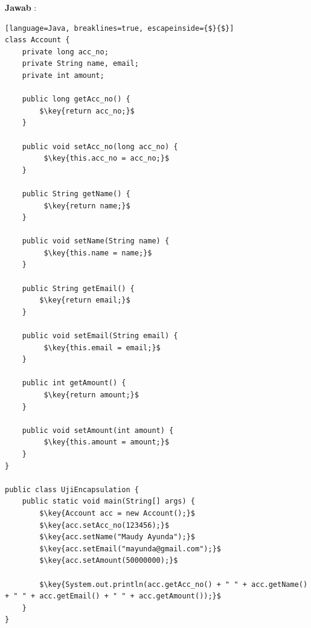 \documentclass[a4paper, 12pt]{article}
\newcommand{\ans}{\textbf{Jawab} :}
\newcommand{\key}[1]{\textcolor{red}{#1}}
\begin{document}
\begin{enumerate}
        \ans
        \begin{lstlisting}[language=Java, breaklines=true, escapeinside={$}{$}]
class Account {
    private long acc_no;
    private String name, email;
    private int amount;
        
    public long getAcc_no() {
        $\key{return acc_no;}$
    }
        
    public void setAcc_no(long acc_no) {
         $\key{this.acc_no = acc_no;}$
    }
        
    public String getName() {
         $\key{return name;}$
    }
        
    public void setName(String name) {
         $\key{this.name = name;}$
    }
        
    public String getEmail() {
        $\key{return email;}$
    }
        
    public void setEmail(String email) {
         $\key{this.email = email;}$
    }
        
    public int getAmount() {
         $\key{return amount;}$
    }
        
    public void setAmount(int amount) {
         $\key{this.amount = amount;}$
    }
}

public class UjiEncapsulation {
    public static void main(String[] args) {
        $\key{Account acc = new Account();}$
        $\key{acc.setAcc_no(123456);}$
        $\key{acc.setName("Maudy Ayunda");}$
        $\key{acc.setEmail("mayunda@gmail.com");}$
        $\key{acc.setAmount(50000000);}$
        
        $\key{System.out.println(acc.getAcc_no() + " " + acc.getName() + " " + acc.getEmail() + " " + acc.getAmount());}$
    }
}
        \end{lstlisting}
        


\end{enumerate}
\end{document}
